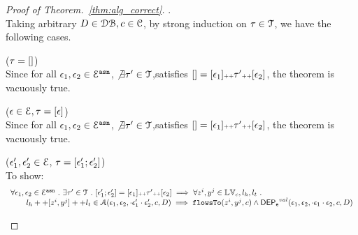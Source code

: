 \begin{proof}[Proof of Theorem.~\ref{thm:alg_correct}].
\\
Taking arbitrary $ D \in \mathcal{DB} , c \in \mathcal{C}$,
by strong induction on $\mathtt{\tau} \in \mathcal{T}$, we have the following cases.
\begin{case}($\mathtt{\tau} = {[]}$)
\\
Since for all $\mathtt{\epsilon}_1, \mathtt{\epsilon}_2 \in \mathcal{E}^{\mathtt{{asn}}}$,
 $\not\exists \mathtt{\tau}' \in \mathcal{T}$,satisfies $
{[]}  = [\mathtt{\epsilon}_1] {\scriptscriptstyle ++} \mathtt{\tau}' {\scriptscriptstyle ++} [\mathtt{\epsilon}_2]$, the theorem is vacuously true.
\end{case}
%
\begin{case}($\mathtt{\epsilon} \in \mathcal{E}, \mathtt{\tau} = [\mathtt{\epsilon}]$)
\\
Since for all $\mathtt{\epsilon}_1, \mathtt{\epsilon}_2 \in \mathcal{E}^{\mathtt{{asn}}}$,
 $\not\exists \mathtt{\tau}' \in \mathcal{T}$,satisfies $
{[]} = [\mathtt{\epsilon}_1] {\scriptscriptstyle ++} \mathtt{\tau}' {\scriptscriptstyle ++} [\mathtt{\epsilon}_2]$, the theorem is vacuously true.
\end{case}
%
%
\begin{case}
\label{case:alg_correct_base}
($\mathtt{\epsilon}_1', \mathtt{\epsilon}_2' \in \mathcal{E} $, $\mathtt{\tau} = [\mathtt{\epsilon}_1'; \mathtt{\epsilon}_2']$)
\\
To show:
\[
\begin{array}{l}
  \forall \mathtt{\epsilon}_1, \mathtt{\epsilon}_2 \in \mathcal{E}^{\mathtt{{asn}}} ~.~
  \exists \mathtt{\tau}' \in \mathcal{T} ~.~ [\mathtt{\epsilon}_1'; \mathtt{\epsilon}_2'] = [\mathtt{\epsilon}_1] {\scriptscriptstyle ++} \mathtt{\tau}' {\scriptscriptstyle ++} [\mathtt{\epsilon}_2]
  \implies    
  \forall  z^i, y^j \in \mathbb{LV}_c, l_h, l_t ~.~ 
    \\ \qquad 
    l_h ++ [z^i, y^j] ++ l_t \in \mathcal{A}(\mathtt{\epsilon}_1, \mathtt{\epsilon}_2, \cdot {} \mathtt{\epsilon}_1' \cdot {} \mathtt{\epsilon}_2', c, D)
   \implies \mathtt{flowsTo}(z^i, y^j, c) \land \mathsf{DEP_{\mathtt{e}}}^{val}(\mathtt{\epsilon}_1, \mathtt{\epsilon}_2, \cdot  \mathtt{\epsilon}_1 \cdot \mathtt{\epsilon}_2, c, D)
\end{array}
\]
\end{case}
\end{proof}
